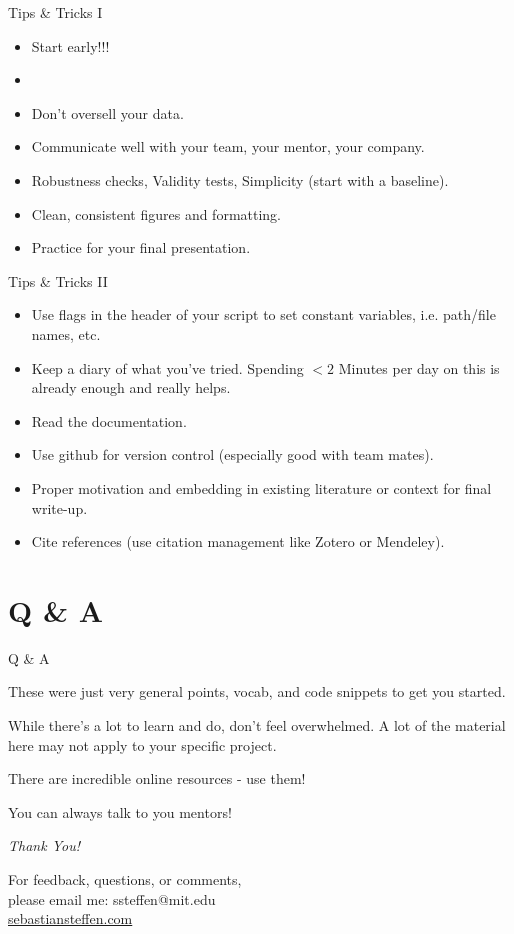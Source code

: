 \documentclass[12pt,aspectratio=169]{beamer}
\newenvironment{wideitemize}{\itemize\addtolength{\itemsep}{10pt}}{\enditemize}
\begin{document}
 \begin{frame}{Tips \& Tricks I}
 \begin{itemize}
 \item Start early!!!
 \item[]
 \item Don't oversell your data.
 \item Communicate well with your team, your mentor, your company.
 \item Robustness checks, Validity tests, Simplicity (start with a baseline).
 \item Clean, consistent figures and formatting.
 \item Practice for your final presentation.
 \end{itemize}
 \end{frame}
 
 
 \begin{frame}{Tips \& Tricks II}
\begin{itemize}
    \item Use flags in the header of your script to set constant variables, i.e. path/file names, etc.
    \item Keep a diary of what you've tried. Spending $<2$ Minutes per day on this is already enough and really helps.
    \item Read the documentation.
    \item Use github for version control (especially good with team mates).
    \item Proper motivation and embedding in existing literature or context for final write-up.
 \item Cite references (use citation management like Zotero or Mendeley).
\end{itemize}
 \end{frame}

\section{Q \& A}
\begin{frame}{Q \& A}
\begin{wideitemize}
\item These were just very general points, vocab, and code snippets to get you started.
\item While there's a lot to learn and do, don't feel overwhelmed. A lot of the material here may not apply to your specific project.
\item There are incredible online resources - use them!
\item[]
\item You can always talk to you mentors!
\end{wideitemize}
\end{frame}


\begin{frame}{}
\vspace*{\fill}
\centering \Large \emph{Thank You!} 
\vspace*{\fill}

For feedback, questions, or comments, \\ please email me: ssteffen@mit.edu \\
\url{sebastiansteffen.com}
\end{frame}
\end{document}
